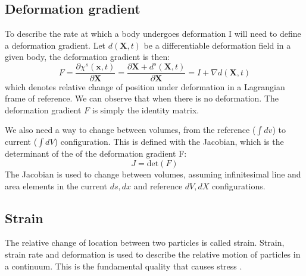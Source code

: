 \subsection{Deformation gradient}
To describe the rate at which a body undergoes deformation I will need to define a deformation gradient.
Let $d(\textbf{X},t)$ be a differentiable deformation field in a given body, the deformation gradient is then:  
\begin{equation}
\label{eq:deformation_gradient}
F = \frac{\partial \chi^s(\textbf{x},t)}{\partial \textbf{X}} = \frac{\partial \textbf{X}  + d^s(\textbf{X} ,t) }{\partial \textbf{X}} =  I + \nabla d(\textbf{X},t) 
\end{equation}
which denotes relative change of position under deformation in a Lagrangian frame of reference. We can observe that when there is no deformation. The deformation gradient $F$ is simply the identity matrix. \newline

We also need a way to change between volumes, from the reference ($\int dv$) to current ($\int dV$) configuration. This is defined with the Jacobian, which is the determinant of the of the deformation gradient F:
\begin{equation}\label{eq:J}
J = \text{det}(F)
\end{equation}
The Jacobian is used to change between volumes, assuming infinitesimal line and area elements in the current $ds, dx$ and reference $dV,dX$ configurations. 

\subsection{Strain}
The relative change of location between two particles is called strain. Strain, strain rate and deformation is used to describe the relative motion of particles in a continuum. This is the fundamental quality that causes stress \cite{Richter2016}.

